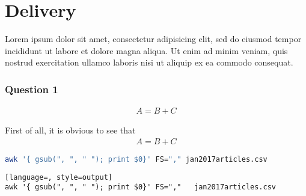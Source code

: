 \setcounter{section}{0}
\setcounter{page}{1}
\section{Delivery} %
Lorem ipsum dolor sit amet, consectetur adipisicing elit, sed do eiusmod tempor incididunt ut labore et dolore magna aliqua. Ut enim ad minim veniam, quis nostrud exercitation ullamco laboris nisi ut aliquip ex ea commodo consequat.

\subsubsection*{Question 1}
\begin{align*}
	\boxed{ A = B + C }
\end{align*}

\begin{sproof}
	First of all, it is obvious to see that
	\begin{align}
		A = B + C
	\end{align}
\end{sproof}

\begin{lstlisting}[language=bash, caption=Code description]
awk '{ gsub(", ", " "); print $0}' FS="," jan2017articles.csv
\end{lstlisting}

\begin{lstlisting}[language=, style=output]
awk '{ gsub(", ", " "); print $0}' FS=","	jan2017articles.csv
\end{lstlisting}
